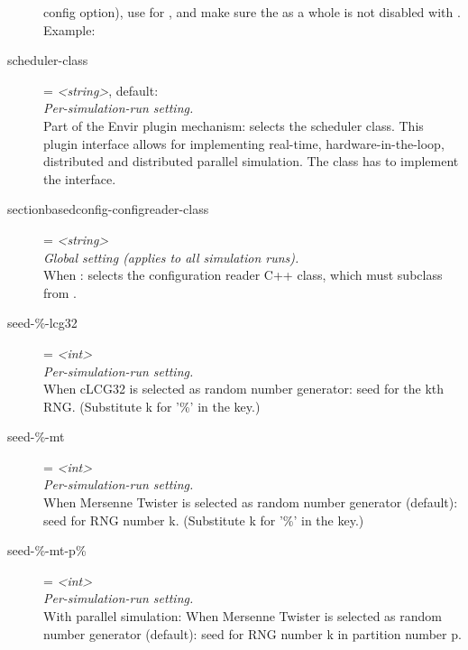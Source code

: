 \begin{description}
    config option), use 
    for , and make sure the
     as a whole is not disabled with
    .\\
    Example:
\item[scheduler-class] = \textit{<string>}, default: \\
    \textit{Per-simulation-run setting.}\\
    Part of the Envir plugin mechanism: selects the scheduler class. This
    plugin interface allows for implementing real-time, hardware-in-the-loop,
    distributed and distributed parallel simulation. The class has to implement
    the  interface.
\item[sectionbasedconfig-configreader-class] = \textit{<string>}\\
    \textit{Global setting (applies to all simulation runs).}\\
    When
    :
    selects the configuration reader C++ class, which must subclass from
    .
\item[seed-\%-lcg32] = \textit{<int>}\\
    \textit{Per-simulation-run setting.}\\
    When cLCG32 is selected as random number generator: seed for the kth RNG.
    (Substitute k for '\%' in the key.)
\item[seed-\%-mt] = \textit{<int>}\\
    \textit{Per-simulation-run setting.}\\
    When Mersenne Twister is selected as random number generator (default):
    seed for RNG number k. (Substitute k for '\%' in the key.)
\item[seed-\%-mt-p\%] = \textit{<int>}\\
    \textit{Per-simulation-run setting.}\\
    With parallel simulation: When Mersenne Twister is selected as random
    number generator (default): seed for RNG number k in partition number p.

\end{description}
